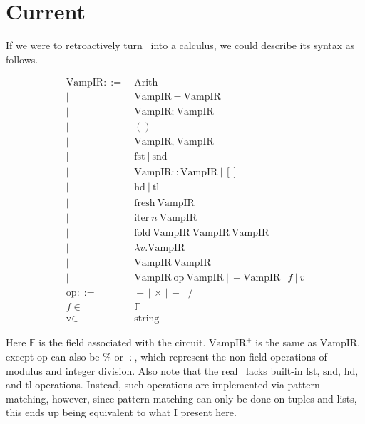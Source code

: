 \documentclass[
    9pt,            %
    techreport,        %
    affiltop,       %
]{art}
\begin{document}
\maketitle

\section{Current \VampIR{}}

If we were to retroactively turn \VampIR{}\ into a calculus, we could describe its syntax as follows.

\begin{align*}
    \text{VampIR} ::=&\ \text{Arith} \\
    |\ &\ \text{VampIR} \ = \ \text{VampIR} \\
    |\ &\ \text{VampIR};\ \text{VampIR} \\
    |\ &\ () \\
    |\ &\ \text{VampIR},\ \text{VampIR} \\
    |\ &\ \text{fst}\ |\ \text{snd} \\
    |\ &\ \text{VampIR}:: \text{VampIR}\ |\ [] \\
    |\ &\ \text{hd}\ |\ \text{tl} \\
    |\ &\ \text{fresh}\ \text{VampIR}^+ \\
    |\ &\ \text{iter}\ n\ \text{VampIR} \\
    |\ &\ \text{fold}\ \text{VampIR}\ \text{VampIR}\ \text{VampIR} \\
    |\ &\ \lambda v . \text{VampIR} \\
    |\ &\ \text{VampIR}\ \text{VampIR} \\
    |\ &\ \text{VampIR} \ \text{op} \ \text{VampIR} \
    |\ - \text{VampIR}\ |\ f\ |\ v \\
    \text{op} ::=&\ + \,|\, \times \,|\, - \,|\, / \\
    f \in&\ \mathbb{F} \\
    \text{v} \in&\ \text{string}
\end{align*}

Here $\mathbb{F}$ is the field associated with the circuit. $\text{VampIR}^+$ is the same as $\text{VampIR}$, except $\text{op}$ can also be $\%$ or $\div$, which represent the non-field operations of modulus and integer division. Also note that the real \VampIR{}\ lacks built-in $\text{fst}$, $\text{snd}$, $\text{hd}$, and $\text{tl}$ operations. Instead, such operations are implemented via pattern matching, however, since pattern matching can only be done on tuples and lists, this ends up being equivalent to what I present here.
\end{document}

